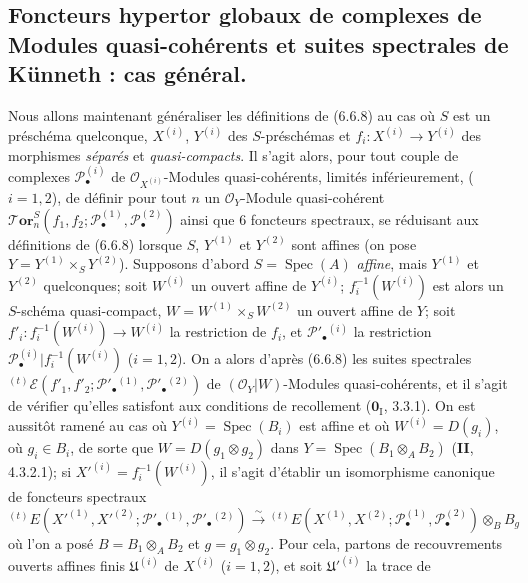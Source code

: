 \subsection{Foncteurs hypertor globaux de complexes de Modules quasi-cohérents
et suites spectrales de Künneth : cas général.}

\begin{env}[6.7.1]
Nous allons maintenant généraliser les définitions de (6.6.8) au cas où $S$
est un préschéma quelconque, $X^{(i)}$, $Y^{(i)}$ des $S$-préschémas et
$f_i:X^{(i)}\to Y^{(i)}$ des morphismes \emph{séparés} et \emph{quasi-compacts}. Il
s'agit alors, pour tout couple de complexes $\mathscr P_\bullet^{(i)}$ de
$\mathscr O_{X^{(i)}}$-Modules quasi-cohérents, limités inférieurement,
($i=1,2$), de définir pour tout $n$ un $\mathscr O_Y$-Module quasi-cohérent
$\boldsymbol{\mathscr{T}\!or}_n^S
(f_1,f_2;\mathscr P_\bullet^{(1)},\mathscr P_\bullet^{(2)})$ ainsi que 6
foncteurs spectraux, se réduisant aux définitions de (6.6.8) lorsque $S$,
$Y^{(1)}$ et $Y^{(2)}$ sont affines (on pose
$Y=Y^{(1)}\times_S Y^{(2)}$).
Supposons d'abord $S=\operatorname{Spec}(A)$ \emph{affine}, mais $Y^{(1)}$
et $Y^{(2)}$ quelconques; soit $W^{(i)}$ un ouvert affine de $Y^{(i)}$;
$f_i^{-1}(W^{(i)})$ est alors un $S$-schéma quasi-compact,
$W=W^{(1)}\times_S W^{(2)}$ un ouvert affine de $Y$; soit
$f'_i:f_i^{-1}(W^{(i)})\to W^{(i)}$ la restriction de $f_i$, et
$\mathscr P'_\bullet{}^{(i)}$ la restriction
$\mathscr P_\bullet^{(i)}|f_i^{-1}(W^{(i)})$ ($i=1,2$). On a alors d'après
(6.6.8) les suites spectrales
${}^{(t)}\mathscr E
(f'_1,f'_2;\mathscr P'_\bullet{}^{(1)},\mathscr P'_\bullet{}^{(2)})$
de $(\mathscr O_Y|W)$-Modules quasi-cohérents, et il s'agit de vérifier
qu'elles satisfont aux conditions de recollement ($\mathbf{0}_{\mathrm I}$, 3.3.1).
On est aussitôt ramené au cas où $Y^{(i)}=\operatorname{Spec}(B_i)$ est affine
et où $W^{(i)}=D(g_i)$, où $g_i\in B_i$, de sorte que
$W=D(g_1\otimes g_2)$
dans $Y=\operatorname{Spec}(B_1\otimes_A B_2)$ (\textbf{II}, 4.3.2.1); si
$X'^{(i)}=f_i^{-1}(W^{(i)})$, il s'agit d'établir un isomorphisme canonique
de foncteurs spectraux
\[
  {}^{(t)}E
  (X'^{(1)},X'^{(2)};
   \mathscr P'_\bullet{}^{(1)},\mathscr P'_\bullet{}^{(2)})
  \xrightarrow{\sim}
  {}^{(t)}E
  (X^{(1)},X^{(2)};
   \mathscr P_\bullet^{(1)},\mathscr P_\bullet^{(2)})
  \otimes_B B_g
  \tag{6.7.1.1}\label{III.6.7.1.1.fr}
\]
où l'on a posé $B=B_1\otimes_A B_2$ et $g=g_1\otimes g_2$. Pour cela,
partons de recouvrements ouverts affines finis $\mathfrak U^{(i)}$ de
$X^{(i)}$ ($i=1,2$), et soit $\mathfrak U'^{(i)}$ la trace de

\end{env}

